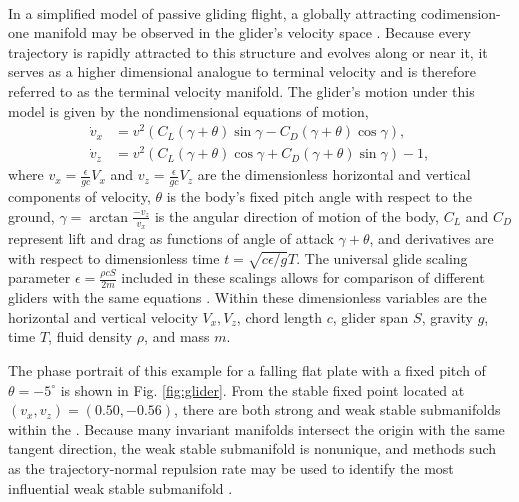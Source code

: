 \documentclass[twocolumn]{svjour3}
\begin{document}
 \\
In a simplified model of passive gliding flight, a globally attracting codimension-one manifold may be observed in the glider's velocity space \cite{yeaton_global_2017,nave2018global}. Because every trajectory is rapidly attracted to this structure and evolves along or near it, it serves as a higher dimensional analogue to terminal velocity and is therefore referred to as the terminal velocity manifold. The glider's motion under this model is given by the nondimensional equations of motion,
\begin{equation}
\begin{aligned}
\dot{v}_x &= v^2\left(C_L\left(\gamma+\theta\right)\sin\gamma - C_D\left(\gamma+\theta\right)\cos\gamma\right), \\
\dot{v}_z &= v^2\left(C_L\left(\gamma+\theta\right)\cos\gamma + C_D\left(\gamma+\theta\right)\sin\gamma\right) - 1,
\end{aligned}
\end{equation}
where $v_x=\tfrac{\epsilon}{gc}V_x$ and $v_z=\tfrac{\epsilon}{gc}V_z$ are the dimensionless horizontal and vertical components of velocity, $\theta$ is the body's fixed pitch angle with respect to the ground, $\gamma=\arctan\tfrac{-v_z}{v_x}$ is the angular direction of motion of the body, $C_L$ and $C_D$ represent lift and drag as functions of angle of attack $\gamma+\theta$, and derivatives are with respect to dimensionless time $t=\sqrt{c\epsilon/g}T$. The universal glide scaling parameter $\epsilon=\tfrac{\rho c S}{2m}$ included in these scalings allows for comparison of different gliders with the same equations \cite{yeaton_global_2017}. Within these dimensionless variables are the horizontal and vertical velocity $V_x,V_z$, chord length $c$, glider span $S$, gravity $g$, time $T$, fluid density $\rho$, and mass $m$.

The phase portrait of this example for a falling flat plate with a fixed pitch of $\theta=-5^\circ$ is shown in Fig. \ref{fig:glider}. From the stable fixed point located at $(v_x,v_z)=(0.50, -0.56)$, there are both strong and weak stable submanifolds within the . Because many invariant manifolds intersect the origin with the same tangent direction, the weak stable submanifold is nonunique, and methods such as the trajectory-normal repulsion rate may be used to identify the most influential weak stable submanifold \cite{haller_variational_2011,nave2018global}.
\end{document}
